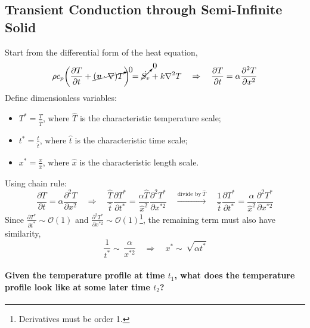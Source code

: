 \documentclass[12pt, a4paper]{article}
\begin{document}
\subsection{Transient Conduction through Semi-Infinite Solid}
Start from the differential form of the heat equation,
\[
    \rho c_{p} \bigg( \frac{\partial T}{\partial t} +\cancelto{0}{(\bm{v} \cdot \nabla) T} \bigg) = \cancelto{0}{\dot{S_{v}}}  +k \nabla^{2} T \quad \Rightarrow \quad \frac{\partial T}{\partial t} = \alpha \frac{\partial^2 T}{\partial x^2}
\]
Define dimensionless variables:
\begin{itemize}
    \item $T^{*} = \frac{T}{\hat{T}}$, where $\hat{T}$ is the characteristic temperature scale;
    \item $t^{*} = \frac{t}{\hat{t}}$, where $\hat{t}$ is the characteristic time scale;
    \item $x^{*} = \frac{x}{\hat{x}}$, where $\hat{x}$ is the characteristic length scale.
\end{itemize}
Using chain rule:
\[
    \frac{\partial T}{\partial t} = \alpha \frac{\partial^2 T}{\partial x^2}
    \quad \Rightarrow \quad
    \frac{\hat{T}}{\hat{t}} \frac{\partial T^{*}}{\partial t^{*}} = \frac{\alpha \hat{T}}{\hat{x}^{2}} \frac{\partial^{2}T^{*}}{\partial x^{*2}} \quad \xrightarrow[]{\text{divide by} \ \hat{T}} \quad \frac{1}{\hat{t}} \frac{\partial T^{*}}{\partial t^{*}} = \frac{\alpha}{\hat{x}^{2}} \frac{\partial^{2}T^{*}}{\partial x^{*2}}
\]
Since $\displaystyle \frac{\partial T^{*}}{\partial t^{*}} \sim \mathcal{O}(1)$ and $\displaystyle \frac{\partial^2 T^{*}}{\partial x^{*2}} \sim \mathcal{O}(1)$\footnote{Derivatives must be order 1.}, the remaining term must also have similarity,
\[
    \frac{1}{t^{*}} \sim \, \frac{\alpha}{x^{*2}}
    \quad \Rightarrow \quad x^{*} \sim \, \sqrt{\alpha t^{*}}
\]
\paragraph{Given the temperature profile at time $t_1$, what does the temperature profile look like at some later time $t_2$?}
\end{document}
